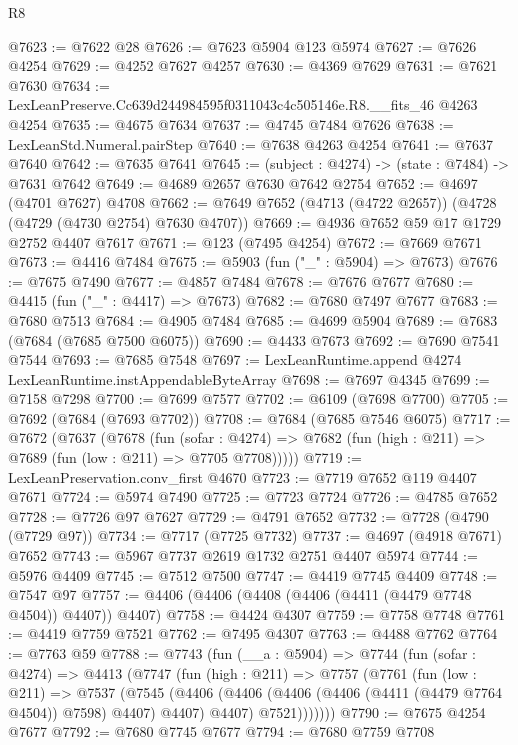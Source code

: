 \begin{lexlean}{R8}
\begin{coremodule}
@7623 := @7622 @28
@7626 := @7623 @5904 @123 @5974
@7627 := @7626 @4254
@7629 := @4252 @7627 @4257
@7630 := @4369 @7629
@7631 := @7621 @7630
@7634 := LexLeanPreserve.Cc639d244984595f0311043c4c505146e.R8.__fits_46 @4263 @4254
@7635 := @4675 @7634
@7637 := @4745 @7484 @7626
@7638 := LexLeanStd.Numeral.pairStep
@7640 := @7638 @4263 @4254
@7641 := @7637 @7640
@7642 := @7635 @7641
@7645 := (subject : @4274) -> (state : @7484) -> @7631 @7642
@7649 := @4689 @2657 @7630 @7642 @2754
@7652 := @4697 (@4701 @7627) @4708
@7662 := @7649 @7652 (@4713 (@4722 @2657)) (@4728 (@4729 (@4730 @2754) @7630 @4707))
@7669 := @4936 @7652 @59 @17 @1729 @2752 @4407 @7617
@7671 := @123 (@7495 @4254)
@7672 := @7669 @7671
@7673 := @4416 @7484
@7675 := @5903 (fun ("_" : @5904) => @7673)
@7676 := @7675 @7490
@7677 := @4857 @7484
@7678 := @7676 @7677
@7680 := @4415 (fun ("_" : @4417) => @7673)
@7682 := @7680 @7497 @7677
@7683 := @7680 @7513
@7684 := @4905 @7484
@7685 := @4699 @5904
@7689 := @7683 (@7684 (@7685 @7500 @6075))
@7690 := @4433 @7673
@7692 := @7690 @7541 @7544
@7693 := @7685 @7548
@7697 := LexLeanRuntime.append @4274 LexLeanRuntime.instAppendableByteArray
@7698 := @7697 @4345
@7699 := @7158 @7298
@7700 := @7699 @7577
@7702 := @6109 (@7698 @7700)
@7705 := @7692 (@7684 (@7693 @7702))
@7708 := @7684 (@7685 @7546 @6075)
@7717 := @7672
    (@7637
      (@7678
        (fun (sofar : @4274) =>
        @7682 (fun (high : @211) => @7689 (fun (low : @211) => @7705 @7708)))))
@7719 := LexLeanPreservation.conv_first @4670
@7723 := @7719 @7652 @119 @4407 @7671
@7724 := @5974 @7490
@7725 := @7723 @7724
@7726 := @4785 @7652
@7728 := @7726 @97 @7627
@7729 := @4791 @7652
@7732 := @7728 (@4790 (@7729 @97))
@7734 := @7717 (@7725 @7732)
@7737 := @4697 (@4918 @7671) @7652
@7743 := @5967 @7737 @2619 @1732 @2751 @4407 @5974
@7744 := @5976 @4409
@7745 := @7512 @7500
@7747 := @4419 @7745 @4409
@7748 := @7547 @97
@7757 := @4406 (@4406 (@4408 (@4406 (@4411 (@4479 @7748 @4504)) @4407)) @4407)
@7758 := @4424 @4307
@7759 := @7758 @7748
@7761 := @4419 @7759 @7521
@7762 := @7495 @4307
@7763 := @4488 @7762
@7764 := @7763 @59
@7788 := @7743
    (fun (__a : @5904) =>
    @7744
      (fun (sofar : @4274) =>
      @4413
        (@7747
          (fun (high : @211) =>
          @7757
            (@7761
              (fun (low : @211) =>
              @7537
                (@7545
                  (@4406
                    (@4406 (@4406 (@4406 (@4411 (@4479 @7764 @4504)) @7598) @4407) @4407)
                    @4407)
                  @7521)))))))
@7790 := @7675 @4254 @7677
@7792 := @7680 @7745 @7677
@7794 := @7680 @7759 @7708

\end{coremodule}
\end{lexlean}
